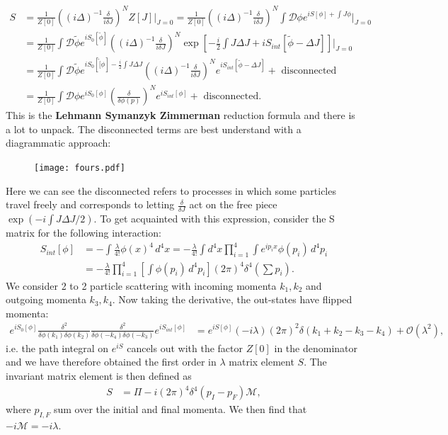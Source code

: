 \documentclass[relqm.tex]{subfiles}
\begin{document}
\begin{align}
    S &= \frac{1}{Z[0]}\left((i\Delta)^{-1}\frac{\delta}{i\delta J}\right)^NZ[J]\bigg|_{J=0} = \frac{1}{Z[0]}\left((i\Delta)^{-1}\frac{\delta}{i\delta J}\right)^N \int \mathcal{D}\phi e^{iS[\phi]+\int J\phi}\bigg|_{J=0} \\
      &= \frac{1}{Z[0]}\int \mathcal{D}\tilde{\phi}e^{iS_0[\tilde{\phi}]}\left((i\Delta)^{-1}\frac{\delta}{i\delta J}\right)^N \exp\left[-\frac{i}{2}\int J\Delta J + iS_{int}[\tilde{\phi}-\Delta J]\right]\bigg|_{J=0} \\
      &= \frac{1}{Z[0]}\int \mathcal{D}\tilde{\phi}e^{iS_0[\tilde[\phi]-\frac{i}{2}\int J\Delta J} \left((i\Delta)^{-1}\frac{\delta}{i\delta J}\right)^N e^{iS_{int}[\tilde{\phi}-\Delta J]}+\text{ disconnected} \\
      &= \frac{1}{Z[0]}\int \mathcal{D}\phi e^{iS_0[\phi]}\left(\frac{\delta}{\delta\phi(p)}\right)^Ne^{iS_{int}[\phi]}+\text{ disconnected}.
\end{align}
This is the \textbf{Lehmann Symanzyk Zimmerman} reduction formula and there is a lot to unpack. 
The disconnected terms are best understand with a diagrammatic approach:
\begin{figure}[H]
    \centering
    \texttt{[image: fours.pdf]}
\end{figure}
Here we can see the disconnected refers to processes in which some particles travel freely and corresponds to letting $\frac{\delta}{\delta J}$ act on the free piece $\exp\left(-i\int J\Delta J/2\right)$.
To get acquainted with this expression, consider the S matrix for the following interaction:
\begin{align}
    S_{int}[\phi] &= -\int \frac{\lambda}{4!}\phi(x)^4\,d^4x = -\frac{\lambda}{4!}\int d^4x \prod_{i=1}^4 \int e^{ip_ix}\phi(p_i)\,d^4p_i \\
                  &= -\frac{\lambda}{4!}\prod_{i=1}^4 \left[\int \phi(p_i)\,d^4p_i\right](2\pi)^4\delta^4\left(\sum p_i\right).
\end{align}
We consider 2 to 2 particle scattering with incoming momenta $k_1,k_2$ and outgoing momenta $k_3,k_4$.
Now taking the derivative, the out-states have flipped momenta:
\begin{align}
    e^{iS_0[\phi]}\frac{\delta^2}{\delta\phi(k_1)\delta\phi(k_2)}\frac{\delta^2}{\delta\phi(-k_4)\delta\phi(-k_3)}e^{iS_{int}[\phi]} &= e^{iS[\phi]}(-i\lambda)(2\pi)^2\delta(k_1+k_2-k_3-k_4)+\mathcal{O}(\lambda^2),
\end{align}
i.e. the path integral on $e^{iS}$ cancels out with the factor $Z[0]$ in the denominator and we have therefore obtained the first order in $\lambda$ matrix element $S$.
The invariant matrix element is then defined as
\begin{align}
    S &= \Pi - i(2\pi)^4\delta^4(p_I-p_F)\mathcal{M},
\end{align}
where $p_{I,F}$ sum over the initial and final momenta. 
We then find that $-i\mathcal{M}=-i\lambda$.
\end{document}
